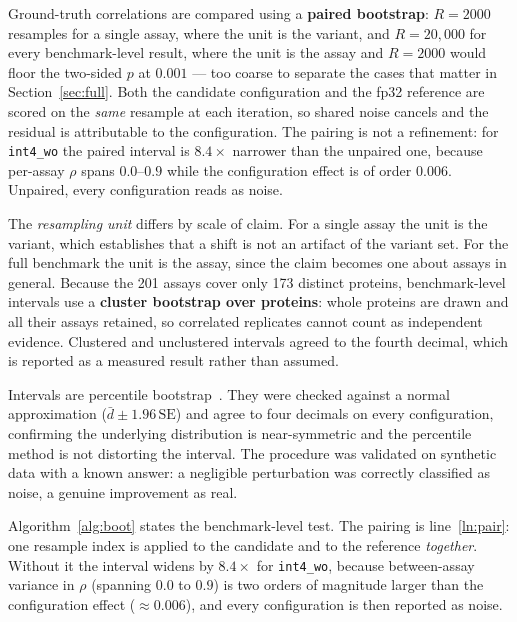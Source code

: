 \documentclass[11pt]{article}
\newcommand{\cfg}[1]{\texttt{#1}}
\begin{document}
Ground-truth correlations are compared using a \textbf{paired bootstrap}:
$R = 2000$ resamples for a single assay, where the unit is the variant, and
$R = 20{,}000$ for every benchmark-level result, where the unit is the assay and
$R = 2000$ would floor the two-sided $p$ at $0.001$ --- too coarse to separate
the cases that matter in Section~\ref{sec:full}. Both the candidate
configuration and the fp32 reference are scored
on the \emph{same} resample at each iteration, so shared noise cancels and the
residual is attributable to the configuration. The pairing is not a refinement:
for \cfg{int4\_wo} the paired interval is $8.4\times$ narrower than the unpaired
one, because per-assay $\rho$ spans $0.0$--$0.9$ while the configuration effect is
of order $0.006$. Unpaired, every configuration reads as noise.

The \emph{resampling unit} differs by scale of claim. For a single assay the
unit is the variant, which establishes that a shift is not an artifact of the
variant set. For the full benchmark the unit is the assay, since the claim
becomes one about assays in general. Because the 201 assays cover only 173
distinct proteins, benchmark-level intervals use a \textbf{cluster bootstrap
over proteins}: whole proteins are drawn and all their assays retained, so
correlated replicates cannot count as independent evidence. Clustered and
unclustered intervals agreed to the fourth decimal, which is reported as a
measured result rather than assumed.

Intervals are percentile bootstrap~\cite{efron1993}. They were checked against a
normal approximation ($\bar{d} \pm 1.96\,\mathrm{SE}$) and agree to four decimals
on every configuration, confirming the underlying distribution is near-symmetric
and the percentile method is not distorting the interval. The procedure was
validated on synthetic data with a known answer: a negligible perturbation was
correctly classified as noise, a genuine improvement as real.

Algorithm~\ref{alg:boot} states the benchmark-level test. The pairing is
line~\ref{ln:pair}: one resample index is applied to the candidate and to the
reference \emph{together}. Without it the interval widens by $8.4\times$ for
\cfg{int4\_wo}, because between-assay variance in $\rho$ (spanning $0.0$ to
$0.9$) is two orders of magnitude larger than the configuration effect
($\approx 0.006$), and every configuration is then reported as noise.
\end{document}
